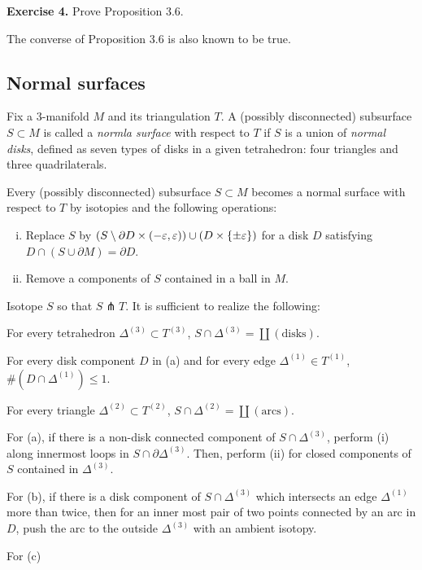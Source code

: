 \documentclass{../../../small}
\begin{document}
\noindent\textbf{Exercise 4.} Prove Proposition 3.6.
\begin{rmk*}
The converse of Proposition 3.6 is also known to be true.
\end{rmk*}

\subsection{Normal surfaces}

Fix a 3-manifold $M$ and its triangulation $T$.
A (possibly disconnected) subsurface $S\subset M$ is called a \emph{normla surface} with respect to $T$ if $S$ is a union of \emph{normal disks}, defined as seven types of disks in a given tetrahedron: four triangles and three quadrilaterals.

\begin{prop}
Every (possibly disconnected) subsurface $S\subset M$ becomes a normal surface with respect to $T$ by isotopies and the following operations:
\begin{enumerate}[(i)]
\item Replace $S$ by $(S\setminus\partial D\times(-\varepsilon,\varepsilon))\cup(D\times\{\pm\varepsilon\})$ for a disk $D$ satisfying $D\cap(S\cup\partial M)=\partial D$.
\item Remove a components of $S$ contained in a ball in $M$.
\end{enumerate}
\end{prop}
\begin{pf}
Isotope $S$ so that $S\pitchfork T$.
It is sufficient to realize the following:
\begin{parts}
\item For every tetrahedron $\Delta^{(3)}\subset T^{(3)}$, $S\cap\Delta^{(3)}=\coprod(\text{disks})$.
\item For every disk component $D$ in (a) and for every edge $\Delta^{(1)}\in T^{(1)}$, $\#(D\cap\Delta^{(1)})\le1$.
\item For every triangle $\Delta^{(2)}\subset T^{(2)}$, $S\cap\Delta^{(2)}=\coprod(\text{arcs})$.
\end{parts}

For (a), if there is a non-disk connected component of $S\cap\Delta^{(3)}$, perform (i) along innermost loops in $S\cap\partial\Delta^{(3)}$.
Then, perform (ii) for closed components of $S$ contained in $\Delta^{(3)}$.

For (b), if there is a disk component of $S\cap\Delta^{(3)}$ which intersects an edge $\Delta^{(1)}$ more than twice, then for an inner most pair of two points connected by an arc in $D$, push the arc to the outside $\Delta^{(3)}$ with an ambient isotopy.

For (c)
\end{pf}
\end{document}
